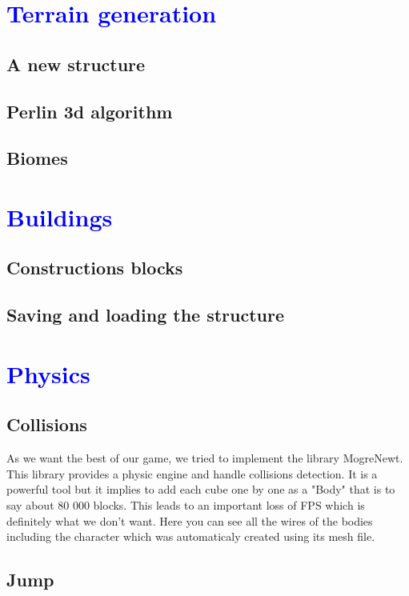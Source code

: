 \documentclass[article]{report} %
\begin{document}
		\chapter{\textcolor{blue}{Terrain generation}}
			\section{A new structure}
				
			\section{Perlin 3d algorithm}
				
			\section{Biomes}
			
		\chapter{\textcolor{blue}{Buildings}}
			\section{Constructions blocks}
			
			\section{Saving and loading the structure}
			
		\chapter{\textcolor{blue}{Physics}}
			\section{Collisions}
				As we want the best of our game, we tried to implement the library MogreNewt. This library provides a physic engine and handle collisions detection. It is a powerful tool but it implies to add each cube one by one as a "Body" that is to say about 80 000 blocks. This leads to an important loss of FPS which is definitely what we don't want. Here you can see all the wires of the bodies including the character which was automaticaly created using its mesh file. 
			\section{Jump}
				
\end{document}
